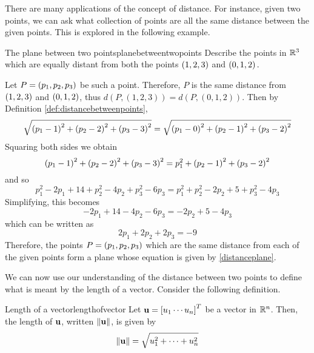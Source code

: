 There are many applications of the concept of distance. For instance,
given two points, we can ask what collection of points are all the
same distance between the given points. This is explored in the
following example.

\begin{example}{The plane between two points}{planebetweentwopoints}
Describe the points in $\mathbb{R}^3$ which are equally distant from both the points $\left(
1,2,3\right) $ and $\left(0,1,2\right) .$
\end{example}

\begin{solution}
Let $P = \left(p_1 , p_2, p_3\right) $ be such a point. Therefore, $P$ is the same distance from $\left(
1,2,3\right) $ and $\left(0,1,2\right) $, thus $d(P,(1,2,3))=d(P,(0,1,2))$.
Then by Definition \ref{def:distancebetweenpoints},
\begin{equation*}
\sqrt{\left(p_1 -1\right) ^{2}+\left(p_2 -2\right) ^{2}+\left(p_3-3\right) ^{2}}=
\sqrt{\left(p_1 - 0 \right)^{2}+\left(p_2-1\right) ^{2}+\left(p_3-2\right) ^{2}}
\end{equation*}
Squaring both sides we obtain 
\begin{equation*}
\left(p_1 -1\right) ^{2}+\left(p_2 -2\right) ^{2}+\left(p_3 -3\right)
^{2}=p_1^{2}+\left(p_2-1\right) ^{2}+\left(p_3 -2\right) ^{2}
\end{equation*}
and so
\begin{equation*}
\allowbreak p_1^{2}-2p_1+14+p_2^{2}-4p_2+p_3^{2}-6p_3=p_1^{2}+p_2^{2}-2p_2+5+p_3^{2}-4p_3
\end{equation*}
Simplifying, this becomes
\begin{equation*}
-2p_1+14-4p_2-6p_3=-2p_2+5-4p_3
\end{equation*}
which can be written as 
\begin{equation}
2p_1+2p_2+2p_3=-9  \label{distanceplane}
\end{equation}
Therefore, the points $P = \left(
p_1,p_2,p_3\right) $  which are the same 
distance from each of the given points form a plane whose equation is given by \ref{distanceplane}.
\end{solution}

We can now use our understanding of the distance between two points to define what is meant by the length of a 
vector. Consider the following definition.  

\begin{definition}{Length of a vector}{lengthofvector}
Let ${\bf u} = \left[u_{1} \cdots u_{n} \right]^T$ be a vector in
$\mathbb{R}^n$. Then, the length of ${\bf u}$, written $\|{\bf u}\|$, is given by
\begin{equation*}
\|
{\bf u}
\|
= \sqrt{ u_{1}^2 + \cdots + u_{n}^2}
\end{equation*}
\end{definition}

